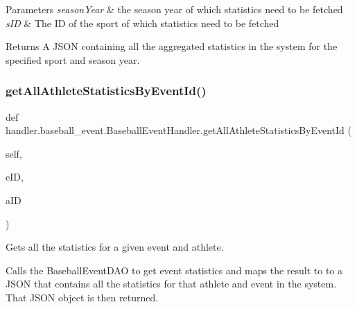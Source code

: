 \begin{DoxyParams}{Parameters}
{\em season\+Year} & the season year of which statistics need to be fetched \\
\hline
{\em s\+ID} & The ID of the sport of which statistics need to be fetched\\
\hline
\end{DoxyParams}
\begin{DoxyReturn}{Returns}
A J\+S\+ON containing all the aggregated statistics in the system for the specified sport and season year. 
\end{DoxyReturn}
\mbox{\label{classhandler_1_1baseball__event_1_1_baseball_event_handler_a79189c942e87b9b2ec03bf567df29303}} 
\subsubsection{\texorpdfstring{get\+All\+Athlete\+Statistics\+By\+Event\+Id()}{getAllAthleteStatisticsByEventId()}}
{\footnotesize\ttfamily def handler.\+baseball\+\_\+event.\+Baseball\+Event\+Handler.\+get\+All\+Athlete\+Statistics\+By\+Event\+Id (\begin{DoxyParamCaption}\item[{}]{self,  }\item[{}]{e\+ID,  }\item[{}]{a\+ID }\end{DoxyParamCaption})}



Gets all the statistics for a given event and athlete. 

Calls the Baseball\+Event\+D\+AO to get event statistics and maps the result to to a J\+S\+ON that contains all the statistics for that athlete and event in the system. That J\+S\+ON object is then returned.


